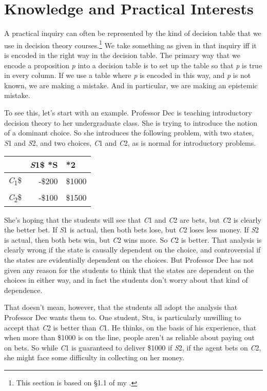 \documentclass[
  11pt,
]{book}
\begin{document}
\hypertarget{structure}{%
\section{Knowledge and Practical Interests}\label{structure}}

A practical inquiry can often be represented by the kind of decision table that we use in decision theory courses.\footnote{This section is based on §1.1 of my \citeyearpar{Weatherson2012}.} We take something as given in that inquiry iff it is encoded in the right way in the decision table. The primary way that we encode a proposition \emph{p} into a decision table is to set up the table so that \emph{p} is true in every column. If we use a table where \emph{p} is encoded in this way, and \emph{p} is not known, we are making a mistake. And in particular, we are making an epistemic mistake.

To see this, let's start with an example. Professor Dec is teaching introductory decision theory to her undergraduate class. She is trying to introduce the notion of a dominant choice. So she introduces the following problem, with two states, \emph{S}1 and \emph{S}2, and two choices, \emph{C}1 and \emph{C}2, as is normal for introductory problems.

\begin{longtable}[]{@{}crl@{}}
\toprule\noalign{}
~ & \emph{S}1\$ *S & *2 \\
\midrule\noalign{}
\endhead
\bottomrule\noalign{}
\endlastfoot
\emph{C}\textsubscript{1}\$ & -\$200 & \$1000 \\
\emph{C}\textsubscript{2}\$ & -\$100 & \$1500 \\
\end{longtable}

She's hoping that the students will see that \emph{C}1 and \emph{C}2 are bets, but \emph{C}2 is clearly the better bet. If \emph{S}1 is actual, then both bets lose, but \emph{C}2 loses less money. If \emph{S}2 is actual, then both bets win, but \emph{C}2 wins more. So \emph{C}2 is better. That analysis is clearly wrong if the state is causally dependent on the choice, and controversial if the states are evidentially dependent on the choices. But Professor Dec has not given any reason for the students to think that the states are dependent on the choices in either way, and in fact the students don't worry about that kind of dependence.

That doesn't mean, however, that the students all adopt the analysis that Professor Dec wants them to. One student, Stu, is particularly unwilling to accept that \emph{C}2 is better than \emph{C}1. He thinks, on the basis of his experience, that when more than \$1000 is on the line, people aren't as reliable about paying out on bets. So while \emph{C}1 is guaranteed to deliver \$1000 if \emph{S}2, if the agent bets on \emph{C}2, she might face some difficulty in collecting on her money.
\end{document}
